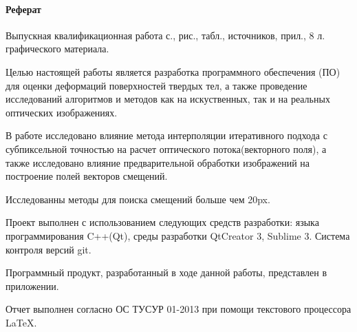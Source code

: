 \newpage
{}
\paragraph{\hfill Реферат \hfill}
Выпускная квалификационная работа  с.,  рис.,  табл.,  источников,  прил., 8 л. графического материала.

Целью настоящей работы является разработка программного обеспечения (ПО) для оценки деформаций поверхностей твердых тел, а также проведение исследований алгоритмов и методов как на искуственных, так и на реальных оптических изображениях.

В работе исследовано влияние метода интерполяции итеративного подхода с субпиксельной точностью на расчет оптического потока(векторного поля), а также исследовано влияние предварительной обработки изображений на построение полей векторов смещений.

Исследованны методы для поиска смещений больше чем 20px. 

 

Проект выполнен с использованием следующих средств разработки: языка программирования C++(Qt), среды разработки QtCreator 3, Sublime 3. Система контроля версий git.

Программный продукт, разработанный в ходе данной работы, представлен в приложении.

Отчет выполнен согласно ОС ТУСУР 01-2013 при помощи текстового процессора \LaTeX.